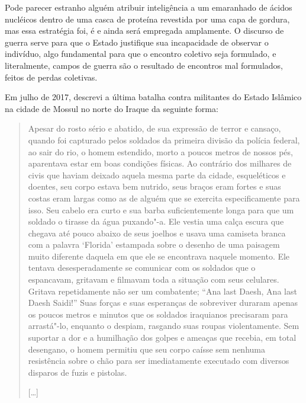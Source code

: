 Pode parecer estranho alguém
atribuir inteligência a um emaranhado de ácidos nucléicos dentro de uma
casca de proteína revestida por uma capa de gordura, mas essa estratégia
foi, é e ainda será empregada amplamente. O discurso de guerra serve
para que o Estado justifique sua incapacidade de observar o indivíduo,
algo fundamental para que o encontro coletivo seja formulado, e
literalmente, campos de guerra são o resultado de encontros mal
formulados, feitos de perdas coletivas.

Em julho de 2017, descrevi a última batalha contra militantes do Estado
Islâmico na cidade de Mossul no norte do Iraque da seguinte forma:

\begin{quote}
Apesar do rosto sério e abatido, de sua expressão de terror e
cansaço, quando foi capturado pelos soldados da primeira divisão da
polícia federal, ao sair do rio, o homem estendido, morto a poucos
metros de nossos pés, aparentava estar em boas condições físicas. Ao
contrário dos milhares de civis que haviam deixado aquela mesma parte da
cidade, esqueléticos e doentes, seu corpo estava bem nutrido, seus
braços eram fortes e suas costas eram largas como as de alguém que se
exercita especificamente para isso. Seu cabelo era curto e sua barba
suficientemente longa para que um soldado o tirasse da água puxando"-a.
Ele vestia uma calça escura que chegava até pouco abaixo de seus joelhos
e usava uma camiseta branca com a palavra `Florida' estampada sobre o
desenho de uma paisagem muito diferente daquela em que ele se encontrava
naquele momento. Ele tentava desesperadamente se comunicar com os
soldados que o espancavam, gritavam e filmavam toda a situação com seus
celulares. Gritava repetidamente não ser um combatente; ``Ana last Daesh,
Ana last Daesh Saidi!'' Suas forças e suas esperanças de
sobreviver duraram apenas os poucos metros e minutos que os soldados
iraquianos precisaram para arrastá"-lo, enquanto o despiam, rasgando suas
roupas violentamente. Sem suportar a dor e a humilhação dos golpes e
ameaças que recebia, em total desengano, o homem permitiu que seu corpo
caísse sem nenhuma resistência sobre o chão para ser imediatamente
executado com diversos disparos de fuzis e pistolas.

[\ldots{}]


\end{quote}
